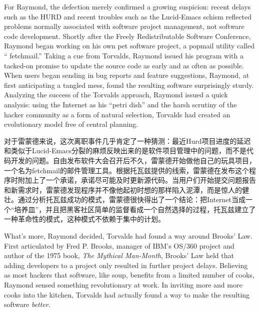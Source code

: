 
\ifdefined\eng
For Raymond, the defection merely confirmed a growing suspicion: recent delays such as the HURD and recent troubles such as the Lucid-Emacs schism reflected problems normally associated with software project management, not software code development. Shortly after the Freely Redistributable Software Conference, Raymond began working on his own pet software project, a popmail utility called `` fetchmail.'' Taking a cue from Torvalds, Raymond issued his program with a tacked-on promise to update the source code as early and as often as possible. When users began sending in bug reports and feature suggestions, Raymond, at first anticipating a tangled mess, found the resulting software surprisingly sturdy. Analyzing the success of the Torvalds approach, Raymond issued a quick analysis: using the Internet as his ``petri dish'' and the harsh scrutiny of the hacker community as a form of natural selection, Torvalds had created an evolutionary model free of central planning.
\fi

\ifdefined\chs
对于雷蒙德来说，这次离职事件几乎肯定了一种猜测：最近Hurd项目进度的延迟和类似于Lucid-Emacs分裂的麻烦反映出来的是软件项目管理中的问题，而不是代码开发的问题。自由发布软件大会召开后不久，雷蒙德开始做他自己的玩具项目，一个名为fetchmail的邮件管理工具。根据托瓦兹提供的线索，雷蒙德在发布这个程序时附加上了一个承诺，承诺尽可能及时更新源代码。当用户们开始提交问题报告和新需求时，雷蒙德发现程序并不像他起初时想的那样陷入泥潭，而是惊人的健壮。通过分析托瓦兹成功的模式，雷蒙德很快得出了一个结论：把Internet当成一个``培养皿''，并且把黑客社区简单的监督看成一个自然选择的过程，托瓦兹建立了一种革命性的模式，这种模式不依赖于集中的计划。
\fi

\ifdefined\eng
What's more, Raymond decided, Torvalds had found a way around Brooks' Law. First articulated by Fred P. Brooks, manager of IBM's OS/360 project and author of the 1975 book, \textit{The Mythical Man-Month}, Brooks' Law held that adding developers to a project only resulted in further project delays. Believing as most hackers that software, like soup, benefits from a limited number of cooks, Raymond sensed something revolutionary at work. In inviting more and more cooks into the kitchen, Torvalds had actually found a way to make the resulting software \textit{better}.
\fi

